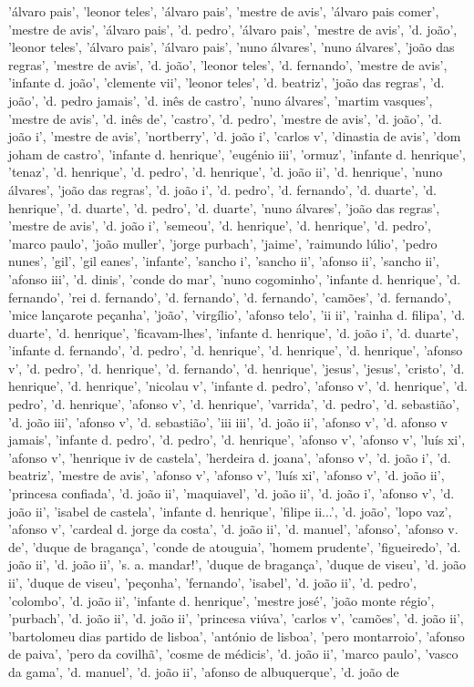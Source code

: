 \documentclass{article}
\begin{document}
\begin{itemize}
'álvaro pais', 'leonor teles', 'álvaro pais', 'mestre de avis', 'álvaro pais comer', 'mestre de avis', 'álvaro pais', 'd. pedro', 'álvaro pais', 'mestre de avis', 'd. joão', 'leonor teles', 'álvaro pais', 'álvaro pais', 'nuno álvares', 'nuno álvares', 'joão das regras', 'mestre de avis', 'd. joão', 'leonor teles', 'd. fernando', 'mestre de avis', 'infante d. joão', 'clemente vii', 'leonor teles', 'd. beatriz', 'joão das regras', 'd. joão', 'd. pedro jamais', 'd. inês de castro', 'nuno álvares', 'martim vasques', 'mestre de avis', 'd. inês de', 'castro', 'd. pedro', 'mestre de avis', 'd. joão', 'd. joão i', 'mestre de avis', 'nortberry', 'd. joão i', 'carlos v', 'dinastia de avis', 'dom joham de castro', 'infante d. henrique', 'eugénio iii', 'ormuz', 'infante d. henrique', 'tenaz', 'd. henrique', 'd. pedro', 'd. henrique', 'd. joão ii', 'd. henrique', 'nuno álvares', 'joão das regras', 'd. joão i', 'd. pedro', 'd. fernando', 'd. duarte', 'd. henrique', 'd. duarte', 'd. pedro', 'd. duarte', 'nuno álvares', 'joão das regras', 'mestre de avis', 'd. joão i', 'semeou', 'd. henrique', 'd. henrique', 'd. pedro', 'marco paulo', 'joão muller', 'jorge purbach', 'jaime', 'raimundo lúlio', 'pedro nunes', 'gil', 'gil eanes', 'infante', 'sancho i', 'sancho ii', 'afonso ii', 'sancho ii', 'afonso iii', 'd. dinis', 'conde do mar', 'nuno cogominho', 'infante d. henrique', 'd. fernando', 'rei d. fernando', 'd. fernando', 'd. fernando', 'camões', 'd. fernando', 'mice lançarote peçanha', 'joão', 'virgílio', 'afonso telo', 'ii ii', 'rainha d. filipa', 'd. duarte', 'd. henrique', 'ficavam-lhes', 'infante d. henrique', 'd. joão i', 'd. duarte', 'infante d. fernando', 'd. pedro', 'd. henrique', 'd. henrique', 'd. henrique', 'afonso v', 'd. pedro', 'd. henrique', 'd. fernando', 'd. henrique', 'jesus', 'jesus', 'cristo', 'd. henrique', 'd. henrique', 'nicolau v', 'infante d. pedro', 'afonso v', 'd. henrique', 'd. pedro', 'd. henrique', 'afonso v', 'd. henrique', 'varrida', 'd. pedro', 'd. sebastião', 'd. joão iii', 'afonso v', 'd. sebastião', 'iii iii', 'd. joão ii', 'afonso v', 'd. afonso v jamais', 'infante d. pedro', 'd. pedro', 'd. henrique', 'afonso v', 'afonso v', 'luís xi', 'afonso v', 'henrique iv de castela', 'herdeira d. joana', 'afonso v', 'd. joão i', 'd. beatriz', 'mestre de avis', 'afonso v', 'afonso v', 'luís xi', 'afonso v', 'd. joão ii', 'princesa confiada', 'd. joão ii', 'maquiavel', 'd. joão ii', 'd. joão i', 'afonso v', 'd. joão ii', 'isabel de castela', 'infante d. henrique', 'filipe ii...', 'd. joão', 'lopo vaz', 'afonso v', 'cardeal d. jorge da costa', 'd. joão ii', 'd. manuel', 'afonso', 'afonso v. de', 'duque de bragança', 'conde de atouguia', 'homem prudente', 'figueiredo', 'd. joão ii', 'd. joão ii', 's. a. mandar!', 'duque de bragança', 'duque de viseu', 'd. joão ii', 'duque de viseu', 'peçonha', 'fernando', 'isabel', 'd. joão ii', 'd. pedro', 'colombo', 'd. joão ii', 'infante d. henrique', 'mestre josé', 'joão monte régio', 'purbach', 'd. joão ii', 'd. joão ii', 'princesa viúva', 'carlos v', 'camões', 'd. joão ii', 'bartolomeu dias partido de lisboa', 'antónio de lisboa', 'pero montarroio', 'afonso de paiva', 'pero da covilhã', 'cosme de médicis', 'd. joão ii', 'marco paulo', 'vasco da gama', 'd. manuel', 'd. joão ii', 'afonso de albuquerque', 'd. joão de 
\end{itemize}
\end{document}
